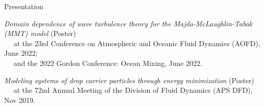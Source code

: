 \documentclass{resume} %
\begin{document}
\begin{rSection}{Presentation}
\begin{etaremune}
 \item \textit{Domain dependence of wave turbulence theory for the Majda-McLaughlin-Tabak (MMT) model} (Poster)\\
 $\left.\quad\right.$ at the 23rd Conference on Atmospheric and Oceanic Fluid Dynamics (AOFD), June 2022;\\
 $\left.\quad\right.$ and the 2022 Gordon Conference: Ocean Mixing, June 2022.
 \item \textit{Modeling systems of drop carrier particles through energy minimization} (Poster) \\
 $\left.\quad\right.$ at the 72nd Annual Meeting of the Division of Fluid Dynamics (APS DFD), Nov 2019.
\end{etaremune}



\end{rSection}

\end{document}
